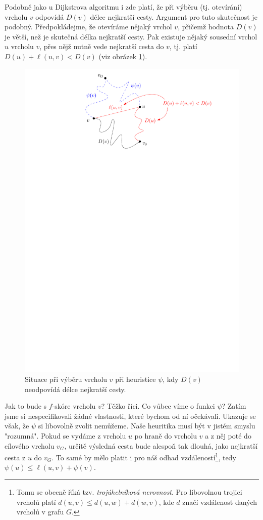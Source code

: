 Podobně jako u Dijkstrova algoritmu i zde platí, že při výběru (tj. otevírání) vrcholu $v$ odpovídá $D(v)$ délce nejkratší cesty. Argument pro tuto skutečnost je podobný. Předpokládejme, že otevíráme nějaký vrchol $v$, přičemž hodnota $D(v)$ je větší, než je skutečná délka nejkratší cesty. Pak existuje nějaký sousední vrchol $u$ vrcholu $v$, přes nějž nutně vede nejkratší cesta do $v$, tj. platí $D(u)+\ell(u,v)<D(v)$ (viz obrázek \ref{fig:astar_kratsi_cesta}).
\begin{figure}[h]
    \centering
    \includegraphics[scale=\graphimgsize]{01-grafalgo/images/ch01_astar_kratsi_cesta.pdf}
    \caption{Situace při výběru vrcholu $v$ při heuristice $\psi$, kdy $D(v)$ neodpovídá délce nejkratší cesty.}
    \label{fig:astar_kratsi_cesta}
\end{figure}
Jak to bude s $f$-skóre vrcholu $v$? Těžko říci. Co vůbec víme o funkci $\psi$? Zatím jsme si nespecifikovali žádné vlastnosti, které bychom od ní očekávali. Ukazuje se však, že $\psi$ si libovolně zvolit nemůžeme. Naše heuritika musí být v jistém smyslu "rozumná". Pokud se vydáme z vrcholu $u$ po hraně do vrcholu $v$ a z něj poté do cílového vrcholu $v_G$, určitě výsledná cesta bude alespoň tak dlouhá, jako nejkratší cesta z $u$ do $v_G$. To samé by mělo platit i pro náš odhad vzdáleností\footnote{Tomu se obecně říká tzv. \emph{trojúhelníková nerovnost}. Pro libovolnou trojici vrcholů platí $d(u,v)\leqslant d(u,w)+d(w,v)$, kde $d$ značí vzdálenost daných vrcholů v grafu $G$.}, tedy $\psi(u)\leqslant\ell(u,v)+\psi(v)$.

